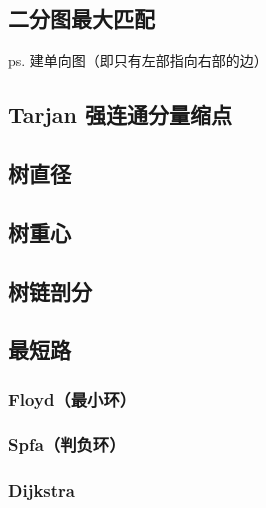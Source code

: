 \documentclass{article}
\begin{document}


\subsection{二分图最大匹配}

ps. 建单向图（即只有左部指向右部的边）



\subsection{Tarjan 强连通分量缩点}



\subsection{树直径}



\subsection{树重心}



\subsection{树链剖分}

\subsection{最短路}

\subsubsection{Floyd（最小环）}



\subsubsection{Spfa（判负环）}



\subsubsection{Dijkstra}
\end{document}
